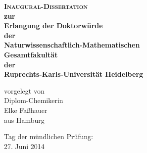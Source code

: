 \documentclass{scrartcl}
\begin{document}
\begin{center}
 \huge
 \textbf{\textsc{Inaugural-Dissertation}\\[5ex]
 \LARGE \textsf{zur\\ Erlangung der Doktorwürde\\
        der\\ Naturwissenschaftlich-Mathematischen\\
        Gesamtfakultät\\
        der\\
        Ruprechts-Karls-Universität
        Heidelberg}}


\vfill
\Large
vorgelegt von\\[2ex]
Diplom-Chemikerin\\
Elke Faßhauer\\[2ex]
aus Hamburg

\vspace{5ex}
Tag der mündlichen Prüfung:\\
27. Juni 2014

\end{center}
\end{document}
